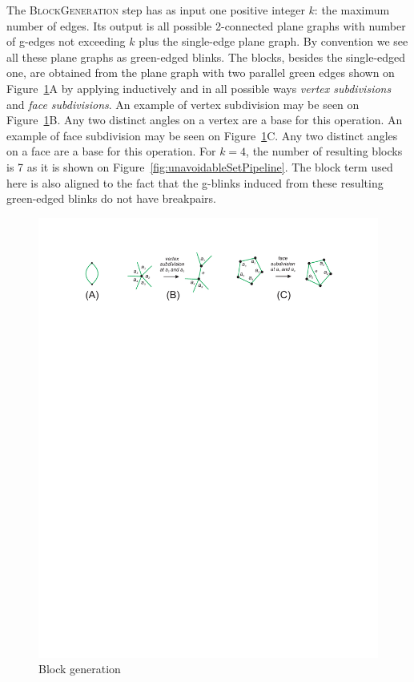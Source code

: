 The \textsc{BlockGeneration} step has as input one positive integer $k$:
the maximum number of edges. Its output is all possible 2-connected
plane graphs with number of g-edges not exceeding $k$ plus the single-edge
plane graph. By convention we see all these plane graphs as
green-edged blinks. The blocks, besides the single-edged one, are
obtained from the plane graph with two parallel green edges shown on
Figure~\ref{fig:blockGeneration}A by applying inductively
and in all possible ways {\it vertex subdivisions} and
{\it face subdivisions}. An example of vertex subdivision may be seen on
Figure~\ref{fig:blockGeneration}B. Any two distinct angles on a
vertex are a base for this operation.  An example of face
subdivision may be seen on Figure~\ref{fig:blockGeneration}C.
Any two distinct angles on a face are a base for
this operation. For $k=4$, the number of resulting
blocks is 7 as it is shown on Figure~\ref{fig:unavoidableSetPipeline}.
The block term used here is also aligned to the fact that the
g-blinks induced from these resulting green-edged blinks do not
have breakpairs.
\begin{figure}[htp]
   \begin{center}
      \leavevmode
      \includegraphics[width=12cm]{fig/blockGeneration.pdf}
   \end{center}
   \vspace{-0.7cm}
   \caption{Block generation}
   \label{fig:blockGeneration}
\end{figure}

